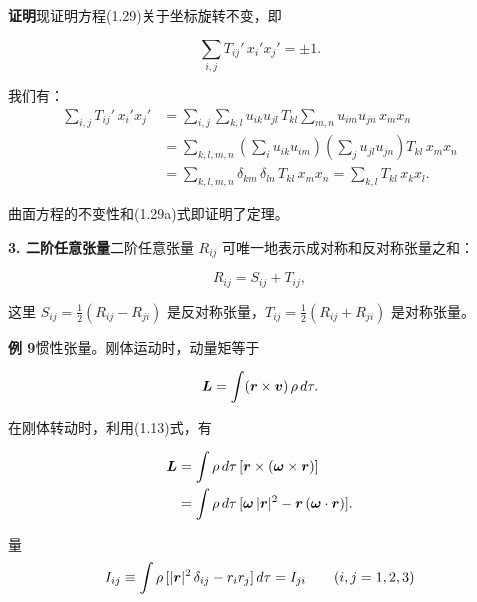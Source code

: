 \textbf{证明}\quad 现证明方程(1.29)关于坐标旋转不变，即

\begin{equation*}
\sum_{i,j} T_{ij}'\, x_i' x_j' = \pm 1.
\end{equation*}

我们有：
\begin{equation*}
\begin{aligned}
\sum_{i,j} T_{ij}'\, x_i' x_j'
&= \sum_{i,j} \sum_{k,l} u_{ik} u_{jl}\, T_{kl} \sum_{m,n} u_{im} u_{jn}\, x_m x_n\\
&= \sum_{k,l,m,n} \left(\sum_{i} u_{ik} u_{im}\right) \left(\sum_{j} u_{jl} u_{jn}\right) T_{kl}\, x_m x_n\\
&= \sum_{k,l,m,n} \delta_{km}\, \delta_{ln}\, T_{kl}\, x_m x_n = \sum_{k,l} T_{kl}\, x_k x_l.
\end{aligned}
\end{equation*}

曲面方程的不变性和(1.29a)式即证明了定理。

\textbf{3. 二阶任意张量}\quad 二阶任意张量 $R_{ij}$ 可唯一地表示成对称和反对称张量之和：

\begin{equation*}
R_{ij} = S_{ij} + T_{ij},
\end{equation*}

这里 $S_{ij} = \frac{1}{2}(R_{ij} - R_{ji})$ 是反对称张量，$T_{ij} = \frac{1}{2}(R_{ij} + R_{ji})$ 是对称张量。

\textbf{例 9}\quad 惯性张量。刚体运动时，动量矩等于

\begin{equation*}
\bm{L} = \int (\bm{r} \times \bm{v})\, \rho\, d\tau.
\end{equation*}

在刚体转动时，利用(1.13)式，有

\begin{equation*}
\begin{aligned}
\bm{L} &= \int \rho\, d\tau\, [\bm{r} \times (\bm{\omega} \times \bm{r})]\\
&= \int \rho\, d\tau\, [\bm{\omega}\,|\bm{r}|^{2} - \bm{r}\,(\bm{\omega} \cdot \bm{r})].
\end{aligned}
\end{equation*}

量
\begin{equation*}
I_{ij} \equiv \int \rho\, [|\bm{r}|^{2}\, \delta_{ij} - r_i r_j]\, d\tau = I_{ji} \qquad (i, j = 1, 2, 3)
\end{equation*}

